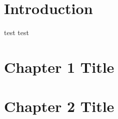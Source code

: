 %
%
%
%




\cleardoublepage
\chapter*{Introduction} %

test test




\chapter{Chapter 1 Title}
\label{ch:1}






\chapter{Chapter 2 Title}
\label{ch:2}

\lipsum[13-20]


\backmatter




\printindex %


